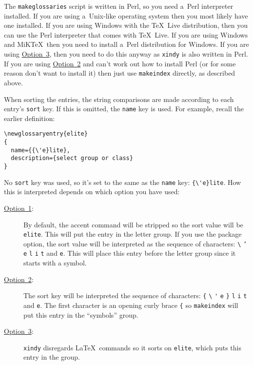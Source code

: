 \documentclass{nlctdoc}
\newcommand*{\opt}[1]{\hyperlink{option#1}{Option~#1}}
\begin{document}
The \texttt{makeglossaries} script is written in Perl, so you need
a~Perl interpreter installed. If you are using a~Unix-like operating
system then you most likely have one installed. If you are using
Windows with the \TeX~Live distribution, then you can use the Perl
interpreter that comes with \TeX~Live. If you are using Windows and
MiK\TeX\ then you need to install a~Perl distribution for Windows.
If you are using \opt3, then you need to do this anyway as
\texttt{xindy} is also written in Perl. If you are using \opt2
and can't work out how to install Perl (or for some reason don't
want to install it) then just use \texttt{makeindex} directly, as
described above.

When sorting the entries, the string comparisons are made according
to each entry's \texttt{sort} key. If this is omitted, the
\texttt{name} key is used. For example, recall the earlier
definition:
\begin{verbatim}
\newglossaryentry{elite}
{
  name={{\'e}lite},
  description={select group or class}
}
\end{verbatim}
No \texttt{sort} key was used, so it's set to the same as the
\texttt{name} key: \verb|{\'e}lite|. How this is interpreted depends
on which option you have used:
\begin{description}
\item[\opt1:] By default, the accent command will be stripped so the
sort value will be \texttt{elite}. This will put the entry in the
 letter group. If you use the
 package option, the sort value will be
interpreted as the sequence of characters: \verb|\| \texttt{'} \texttt{e}
\texttt{l} \texttt{i} \texttt{t} and \texttt{e}. This will place
this entry before the  letter group since it starts with a symbol.

\item[\opt2:] The sort key will be interpreted the sequence of characters:
\verb|{| \verb|\| \verb|'| \texttt{e} \verb|}| \texttt{l} \texttt{i} \texttt{t}
and \texttt{e}. The first character is an opening curly brace
\verb|{| so \texttt{makeindex} will put this entry in the ``symbols'' group. 

\item[\opt3:]
\texttt{xindy} disregards \LaTeX\ commands so it sorts on
\texttt{elite}, which puts this entry in the  group.
\end{description}
\end{document}
